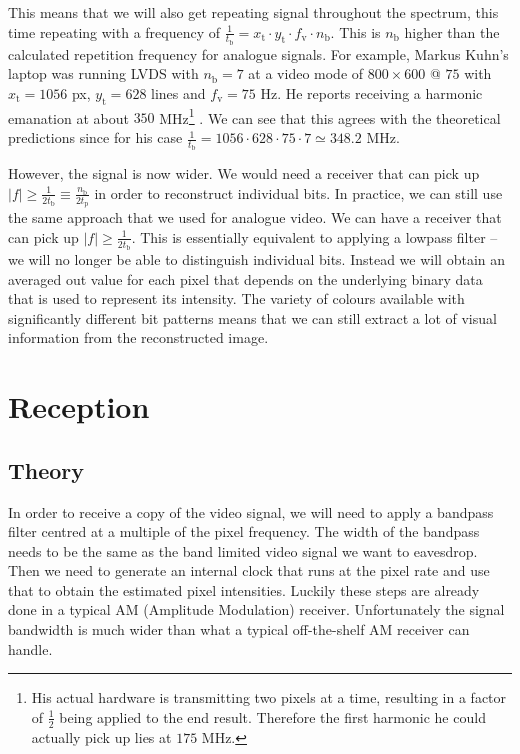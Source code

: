 \documentclass[a4paper,12pt,twoside,openright]{report}
\begin{document}
This means that we will also get repeating signal throughout the spectrum, this time repeating with a frequency of $\frac{1}{t_\text{b}} = x_\text{t} \cdot y_\text{t} \cdot f_\text{v} \cdot n_\text{b}$. This is $n_\text{b}$ higher than the calculated repetition frequency for analogue signals. For example, Markus Kuhn's laptop was running LVDS with $n_\text{b}=7$ at a video mode of $800 \times 600 $ @ $ 75$ with $x_\text{t} = 1056$ px, $y_\text{t} = 628$ lines and $f_\text{v} = 75$ Hz. He reports receiving a harmonic emanation at about $350$ MHz\footnote{His actual hardware is transmitting two pixels at a time, resulting in a factor of $\frac{1}{2}$ being applied to the end result. Therefore the first harmonic he could actually pick up lies at $175$ MHz.} \cite{kuhn2005electromagnetic}. We can see that this agrees with the theoretical predictions since for his case $\frac{1}{t_\text{b}} = 1056 \cdot 628 \cdot 75 \cdot 7 \simeq 348.2$ MHz.

However, the signal is now wider. We would need a receiver that can pick up $|f| \geq \frac{1}{2 t_\text{b}} \equiv \frac{n_\text{b}}{2 t_\text{p}}$ in order to reconstruct individual bits. In practice, we can still use the same approach that we used for analogue video. We can have a receiver that can pick up $|f| \geq \frac{1}{2 t_\text{b}}$. This is essentially equivalent to applying a lowpass filter -- we will no longer be able to distinguish individual bits. Instead we will obtain an averaged out value for each pixel that depends on the underlying binary data that is used to represent its intensity. The variety of colours available with significantly different bit patterns means that we can still extract a lot of visual information from the reconstructed image.

\section{Reception}

\subsection{Theory}
In order to receive a copy of the video signal, we will need to apply a bandpass filter centred at a multiple of the pixel frequency. The width of the bandpass needs to be the same as the band limited video signal we want to eavesdrop. Then we need to generate an internal clock that runs at the pixel rate and use that to obtain the estimated pixel intensities. Luckily these steps are already done in a typical AM (Amplitude Modulation) receiver. Unfortunately the signal bandwidth is much wider than what a typical off-the-shelf AM receiver can handle.
\end{document}
